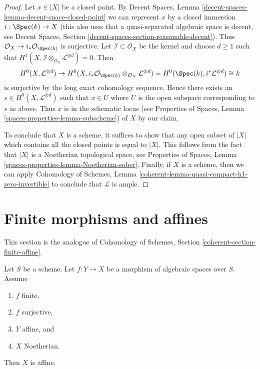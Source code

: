 \begin{proof}
\medskip\noindent
Let $x \in |X|$ be a closed point. By Decent Spaces, Lemma
\ref{decent-spaces-lemma-decent-space-closed-point}
we can represent $x$ by a closed immersion $i : \Spec(k) \to X$
(this also uses that a quasi-separated algebraic space is
decent, see Decent Spaces, Section
\ref{decent-spaces-section-reasonable-decent}).
Thus $\mathcal{O}_X \to i_*\mathcal{O}_{\Spec(k)}$ is surjective.
Let $\mathcal{I} \subset \mathcal{O}_X$ be the kernel and choose
$d \geq 1$ such that
$H^1(X, \mathcal{I} \otimes_{\mathcal{O}_X} \mathcal{L}^{\otimes d}) = 0$.
Then
$$
H^0(X, \mathcal{L}^{\otimes d}) \to
H^0(X,
i_*\mathcal{O}_{\Spec(k)} \otimes_{\mathcal{O}_X} \mathcal{L}^{\otimes d}) =
H^0(\Spec(k), i^*\mathcal{L}^{\otimes d}) \cong k
$$
is surjective by the long exact cohomology sequence. Hence
there exists an $s \in H^0(X, \mathcal{L}^{\otimes d})$
such that $x \in U$ where $U$ is the open subspace corresponding to $s$
as above. Thus $x$ is in the schematic locus
(see Properties of Spaces, Lemma \ref{spaces-properties-lemma-subscheme})
of $X$ by our claim.

\medskip\noindent
To conclude that $X$ is a scheme, it suffices to show that
any open subset of $|X|$ which contains all the closed points
is equal to $|X|$. This follows from the fact that $|X|$
is a Noetherian topological space, see
Properties of Spaces, Lemma \ref{spaces-properties-lemma-Noetherian-sober}.
Finally, if $X$ is a scheme, then we can apply
Cohomology of Schemes, Lemma
\ref{coherent-lemma-quasi-compact-h1-zero-invertible}
to conclude that $\mathcal{L}$ is ample.
\end{proof}









\section{Finite morphisms and affines}
\label{section-finite-affine}

\noindent
This section is the analogue of
Cohomology of Schemes, Section \ref{coherent-section-finite-affine}.

\begin{lemma}
\label{lemma-image-affine-finite-morphism-affine-Noetherian}
Let $S$ be a scheme. Let $f : Y \to X$ be a morphism of algebraic
spaces over $S$. Assume
\begin{enumerate}
\item $f$ finite,
\item $f$ surjective,
\item $Y$ affine, and
\item $X$ Noetherian.
\end{enumerate}
Then $X$ is affine.
\end{lemma}

